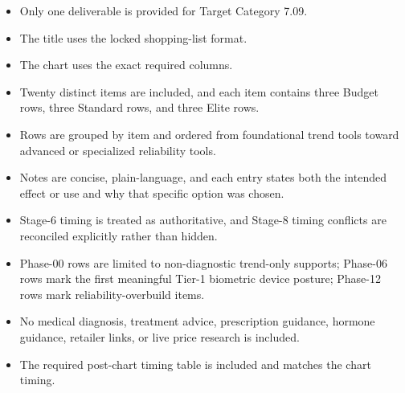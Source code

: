 \documentclass[10pt]{article}
\begin{document}
\begin{itemize}
\item Only one deliverable is provided for Target Category 7.09.
\item The title uses the locked shopping-list format.
\item The chart uses the exact required columns.
\item Twenty distinct items are included, and each item contains three Budget rows, three Standard rows, and three Elite rows.
\item Rows are grouped by item and ordered from foundational trend tools toward advanced or specialized reliability tools.
\item Notes are concise, plain-language, and each entry states both the intended effect or use and why that specific option was chosen.
\item Stage-6 timing is treated as authoritative, and Stage-8 timing conflicts are reconciled explicitly rather than hidden.
\item Phase-00 rows are limited to non-diagnostic trend-only supports; Phase-06 rows mark the first meaningful Tier-1 biometric device posture; Phase-12 rows mark reliability-overbuild items.
\item No medical diagnosis, treatment advice, prescription guidance, hormone guidance, retailer links, or live price research is included.
\item The required post-chart timing table is included and matches the chart timing.
\end{itemize}
\end{document}
